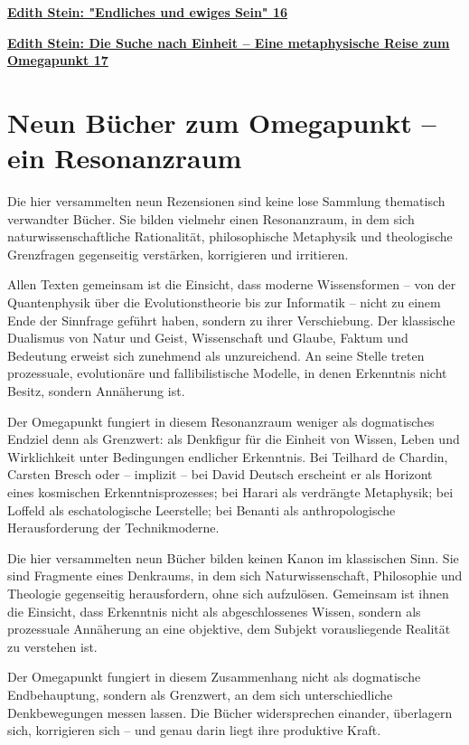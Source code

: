 \documentclass[
]{article}
\begin{document}
\hyperref[edith-stein-endliches-und-ewiges-sein]{\textbf{Edith Stein: "Endliches und ewiges Sein" 16}}

\hyperref[edith-stein-die-suche-nach-einheit-eine-metaphysische-reise-zum-omegapunkt]{\textbf{Edith Stein: Die Suche nach Einheit -- Eine metaphysische Reise zum Omegapunkt 17}}

\section{Neun Bücher zum Omegapunkt -- ein Resonanzraum}\label{neun-buxfccher-zum-omegapunkt-ein-resonanzraum}

Die hier versammelten neun Rezensionen sind keine lose Sammlung thematisch verwandter Bücher. Sie bilden vielmehr einen Resonanzraum, in dem sich naturwissenschaftliche Rationalität, philosophische Metaphysik und theologische Grenzfragen gegenseitig verstärken, korrigieren und irritieren.

Allen Texten gemeinsam ist die Einsicht, dass moderne Wissensformen -- von der Quantenphysik über die Evolutionstheorie bis zur Informatik -- nicht zu einem Ende der Sinnfrage geführt haben, sondern zu ihrer Verschiebung. Der klassische Dualismus von Natur und Geist, Wissenschaft und Glaube, Faktum und Bedeutung erweist sich zunehmend als unzureichend. An seine Stelle treten prozessuale, evolutionäre und fallibilistische Modelle, in denen Erkenntnis nicht Besitz, sondern Annäherung ist.

Der Omegapunkt fungiert in diesem Resonanzraum weniger als dogmatisches Endziel denn als Grenzwert: als Denkfigur für die Einheit von Wissen, Leben und Wirklichkeit unter Bedingungen endlicher Erkenntnis. Bei Teilhard de Chardin, Carsten Bresch oder -- implizit -- bei David Deutsch erscheint er als Horizont eines kosmischen Erkenntnisprozesses; bei Harari als verdrängte Metaphysik; bei Loffeld als eschatologische Leerstelle; bei Benanti als anthropologische Herausforderung der Technikmoderne.

Die hier versammelten neun Bücher bilden keinen Kanon im klassischen Sinn. Sie sind Fragmente eines Denkraums, in dem sich Naturwissenschaft, Philosophie und Theologie gegenseitig herausfordern, ohne sich aufzulösen. Gemeinsam ist ihnen die Einsicht, dass Erkenntnis nicht als abgeschlossenes Wissen, sondern als prozessuale Annäherung an eine objektive, dem Subjekt vorausliegende Realität zu verstehen ist.

Der Omegapunkt fungiert in diesem Zusammenhang nicht als dogmatische Endbehauptung, sondern als Grenzwert, an dem sich unterschiedliche Denkbewegungen messen lassen. Die Bücher widersprechen einander, überlagern sich, korrigieren sich -- und genau darin liegt ihre produktive Kraft.
\end{document}
